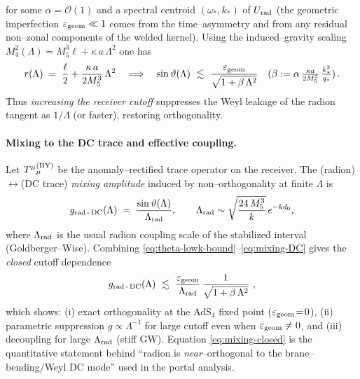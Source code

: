 \documentclass[10pt]{article}
\theoremstyle{definition}
\theoremstyle{plain}
\begin{document}
for some $\alpha=\mathcal O(1)$ and a spectral centroid $(\omega_\ast,k_\ast)$ of $U_{\rm rad}$
(the geometric imperfection $\varepsilon_{\rm geom}\ll1$ comes from the time–asymmetry and from
any residual non–zonal components of the welded kernel). Using the induced–gravity scaling
\(
M_4^2(\Lambda)=M_5^3\ell+\kappa\,a\,\Lambda^2
\)
one has
\[
r(\Lambda)\;=\;\frac{\ell}{2}+\frac{\kappa\,a}{2M_5^3}\,\Lambda^2
\quad\Longrightarrow\quad
\sin\vartheta(\Lambda)\ \lesssim\ 
\frac{\varepsilon_{\rm geom}}{\sqrt{1+\beta\,\Lambda^2}}\quad
(\beta:=\alpha\,\tfrac{\kappa a}{2M_5^3}\,\tfrac{k_\ast^2}{q_\ast})\,.
\]
Thus \emph{increasing the receiver cutoff} suppresses the Weyl leakage of the radion tangent as
$1/\Lambda$ (or faster), restoring orthogonality.

\paragraph{Mixing to the DC trace and effective coupling.}\label{par:uom-main-122}
Let $T^\mu{}_\mu^{\rm (BY)}$ be the anomaly–rectified trace operator on the receiver. The
(radion)$\leftrightarrow$(DC trace) \emph{mixing amplitude} induced by non–orthogonality at
finite $\Lambda$ is
\begin{equation}
\label{eq:mixing-DC}
g_{{\rm rad}\,\text{-}\,{\rm DC}}(\Lambda)\;=\;\frac{\sin\vartheta(\Lambda)}{\Lambda_{\rm rad}},
\qquad
\Lambda_{\rm rad}\sim\sqrt{\frac{24\,M_5^3}{k}}\,e^{-kd_0},
\end{equation}
where $\Lambda_{\rm rad}$ is the usual radion coupling scale of the stabilized interval (Goldberger–Wise).
Combining \eqref{eq:theta-lowk-bound}–\eqref{eq:mixing-DC} gives the \emph{closed} cutoff dependence
\begin{equation}
\label{eq:mixing-closed}
g_{{\rm rad}\,\text{-}\,{\rm DC}}(\Lambda)\ \lesssim\ 
\frac{\varepsilon_{\rm geom}}{\Lambda_{\rm rad}}\,
\frac{1}{\sqrt{1+\beta\,\Lambda^2}}\ ,
\end{equation}
which shows: (i) exact orthogonality at the AdS$_4$ fixed point ($\varepsilon_{\rm geom}\!=\!0$),
(ii) parametric suppression $g\propto \Lambda^{-1}$ for large cutoff even when
$\varepsilon_{\rm geom}\neq 0$, and (iii) decoupling for large $\Lambda_{\rm rad}$ (stiff GW).
Equation \eqref{eq:mixing-closed} is the quantitative statement behind “radion is
\emph{near}–orthogonal to the brane–bending/Weyl DC mode” used in the portal analysis.
\end{document}
